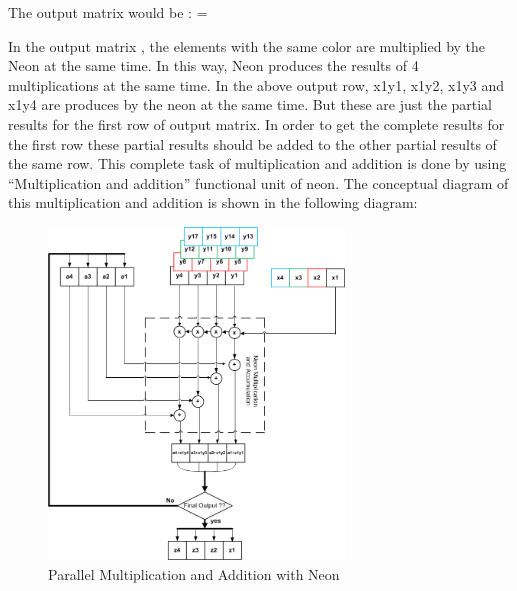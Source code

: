 The output matrix would be : 
=
\begin{table}[h]
\end{table}

In the output matrix ,  the  elements with the same color are multiplied by the Neon at the same time. In this way, Neon produces the results of 4 multiplications at the same time.  In the above output row, x1y1, x1y2, x1y3 and x1y4 are produces by the neon at the same time.  But these are just the partial results for the first row of output matrix. In order to get the complete results for the first row these partial results should be added to the other partial results  of the same row.  This complete task of multiplication and addition is done by using “Multiplication and addition” functional unit of neon. The conceptual diagram of this multiplication and addition is shown in the following diagram:
\begin{figure}[h]
\centering 
\includegraphics[width= 0.7\textwidth]{MandA}
\caption{Parallel Multiplication and Addition with Neon  }
\label{Multiplication and Addition}
\end{figure}
